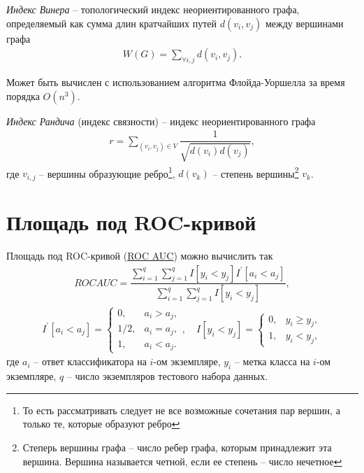 \documentclass[%
	11pt,
	a4paper,
	utf8,
		]{article}
\begin{document}
\emph{Индекс Винера} -- топологический индекс неориентированного графа, определяемый как сумма длин кратчайших путей $ d(v_i, v_j) $ между вершинами графа
\begin{align*}
	W(G) = \sum_{\forall i, j} d(v_i, v_j).
\end{align*}

Может быть вычислен с использованием алгоритма Флойда-Уоршелла за время порядка $ O(n^3) $.

\emph{Индекс Рандича} (индекс связности) -- индекс неориентированного графа
\begin{align*}
	r = \sum_{(v_i, v_j) \in V} \dfrac{1}{ \sqrt{d(v_i)d(v_j)} },
\end{align*}
где $ v_{i, j} $ -- вершины образующие ребро\footnote{То есть рассматривать следует не все возможные сочетания пар вершин, а только те, которые образуют ребро}, $ d(v_k) $ -- степень вершины\footnote{Степерь вершины графа -- число ребер графа, которым принадлежит эта вершина. Вершина называется четной, если ее степень -- число нечетное} $ v_k $.


\section{Площадь под ROC-кривой}

Площадь под ROC-кривой (\href{https://dyakonov.org/2017/07/28/auc-roc-площадь-под-кривой-ошибок/}{ROC AUC}) можно вычислить так
\begin{align*}
	ROC AUC = \dfrac{ \sum\limits_{i=1}^{q}\sum\limits_{j=1}^{q} I[y_i < y_j] I^{'}[a_i < a_j]}{ \sum\limits_{i=1}^{q}\sum\limits_{j=1}^{q} I[y_i < y_j] },
\end{align*}
\vspace*{-5mm}
\begin{align*}
	I^{'}[a_i < a_j] =
	    \begin{cases}
		    0, &a_i > a_j,\\
		    1/2, &a_i = a_j,\\
		    1, &a_i < a_j.
		\end{cases}, \quad I[y_i < y_j] = 
	        \begin{cases}
	        	0, &y_i \geqslant y_j,\\
	        	1, &y_i < y_j,
	        \end{cases}
\end{align*}
где $ a_i $ -- ответ классификатора на $ i $-ом экземпляре, $ y_i $ -- метка класса на $ i $-ом экземпляре, $ q $ -- число экземпляров тестового набора данных.
\end{document}
